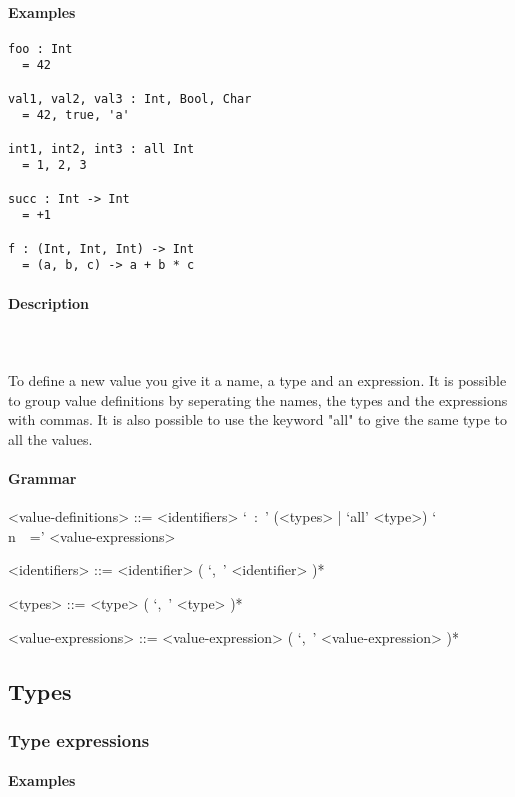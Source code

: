 \documentclass{article}
\def\pend{\mbox{} \\\\}
\begin{document}
\paragraph{Examples}

\begin{verbatim}
foo : Int
  = 42

val1, val2, val3 : Int, Bool, Char
  = 42, true, 'a'

int1, int2, int3 : all Int
  = 1, 2, 3

succ : Int -> Int
  = +1

f : (Int, Int, Int) -> Int
  = (a, b, c) -> a + b * c
\end{verbatim}

\paragraph{Description}\pend
To define a new value you give it a name, a type and an expression. It is possible
to group value definitions by seperating the names, the types and the expressions
with commas. It is also possible to use the keyword "all" to give the same type
to all the values.

\paragraph{Grammar}
\begin{grammar}
<value-definitions> ::=
<identifiers> `\ :\ ' (<types> | `all' <type>) `\\n\ \ =' <value-expressions>

<identifiers> ::= <identifier> ( `,\ ' <identifier> )*  

<types> ::= <type> ( `,\ ' <type> )*  

<value-expressions> ::= <value-expression> ( `,\ ' <value-expression> )*  
\end{grammar}


\subsection{Types}

\subsubsection{Type expressions}

\paragraph{Examples}
\end{document}
